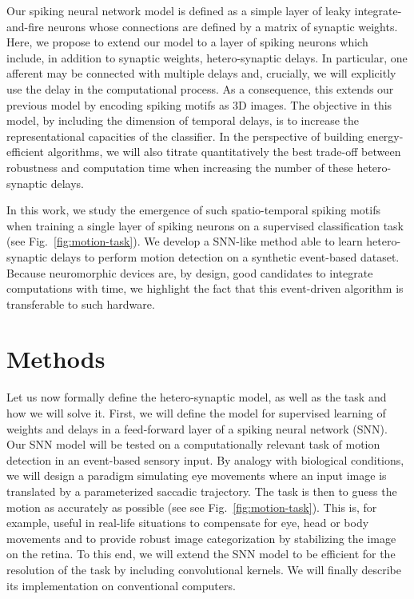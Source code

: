 \documentclass[default]{sn-jnl}%
\theoremstyle{thmstyleone}%
\theoremstyle{thmstyletwo}%
\theoremstyle{thmstylethree}%
\newcommand{\seeFig}[1]{see Fig.~\ref{fig:#1}}%
\begin{document}
Our spiking neural network model is defined as a simple layer of leaky integrate-and-fire neurons whose connections are defined by a matrix of synaptic weights. Here, we propose to extend our model to a layer of spiking neurons which include, in addition to synaptic weights, hetero-synaptic delays. In particular, one afferent may be connected with multiple delays and, crucially, we will explicitly use the delay in the computational process. As a consequence, this extends our previous model by encoding spiking motifs as 3D images. The objective in this model, by including the dimension of temporal delays, is to increase the representational capacities of the classifier. In the perspective of building energy-efficient algorithms, we will also titrate quantitatively the best trade-off between robustness and computation time when increasing the number of these hetero-synaptic delays. %

In this work, we study the emergence of such spatio-temporal spiking motifs when training a single layer of spiking neurons on a supervised classification task (\seeFig{motion-task}). We develop a SNN-like method able to learn hetero-synaptic delays to perform motion detection on a synthetic event-based dataset. Because neuromorphic devices are, by design, good candidates to integrate computations with time, we highlight the fact that this event-driven algorithm is transferable to such hardware.
%
\section{Methods}
\label{sec:methods}
%
%
Let us now formally define the hetero-synaptic model, as well as the task and how we will solve it. First, we will define the model for supervised learning of weights and delays in a feed-forward layer of a spiking neural network (SNN). Our SNN model will be tested on a computationally relevant task of motion detection in an event-based sensory input. By analogy with biological conditions, we will design a paradigm simulating eye movements where an input image is translated by a parameterized saccadic trajectory. The task is then to guess the motion as accurately as possible (see \seeFig{motion-task}). This is, for example, useful in real-life situations to compensate for eye, head or body movements and to provide robust image categorization by stabilizing the image on the retina. To this end, we will extend the SNN model to be efficient for the resolution of the task by including convolutional kernels. We will finally describe its implementation on conventional computers. 
\end{document}
